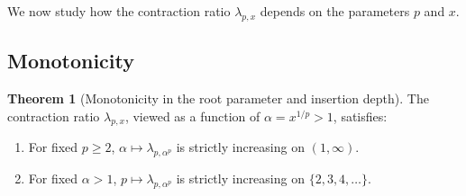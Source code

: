 \documentclass[11pt,a4paper]{article}
\theoremstyle{definition}
\newtheorem{theorem}{Theorem}[section]
\begin{document}
We now study how the contraction ratio $\lambda_{p,x}$ depends on the parameters $p$ and $x$.

\subsection{Monotonicity}

\begin{theorem}[Monotonicity in the root parameter and insertion depth]
\label{thm:monotonicity}
The contraction ratio $\lambda_{p,x}$, viewed as a function of $\alpha = x^{1/p} > 1$, satisfies:
\begin{enumerate}
  \item For fixed $p \geq 2$, $\alpha \mapsto \lambda_{p,\alpha^p}$ is strictly increasing on $(1,\infty)$.
  \item For fixed $\alpha > 1$, $p \mapsto \lambda_{p,\alpha^p}$ is strictly increasing on $\{2,3,4,\ldots\}$.
\end{enumerate}
\end{theorem}
\end{document}
